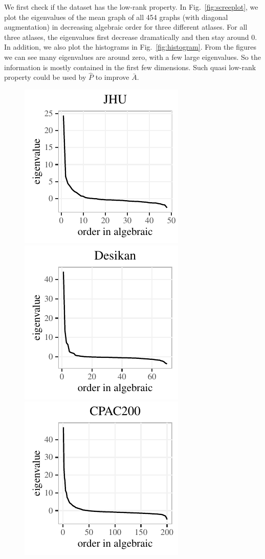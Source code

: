 \documentclass[simplex.tex]{subfiles}
\begin{document}
We first check if the dataset has the low-rank property. In Fig.~\ref{fig:screeplot}, we plot the eigenvalues of the mean graph of all 454 graphs (with diagonal augmentation) in decreasing algebraic order for three different atlases. For all three atlases, the eigenvalues first decrease dramatically and then stay around 0. In addition, we also plot the histograms in Fig.~\ref{fig:histogram}. From the figures we can see many eigenvalues are around zero, with a few large eigenvalues. So the information is mostly contained in the first few dimensions. Such quasi low-rank property could be used by $\hat{P}$ to improve $\bar{A}$.
\begin{figure}[!htbp]
\centering
\includegraphics[height=.2\textheight]{../../figs/screeplot_JHU.pdf} 
\includegraphics[height=.2\textheight]{../../figs/screeplot_desikan.pdf} 
\includegraphics[height=.2\textheight]{../../figs/screeplot_CPAC200.pdf}

\end{figure}
\end{document}
